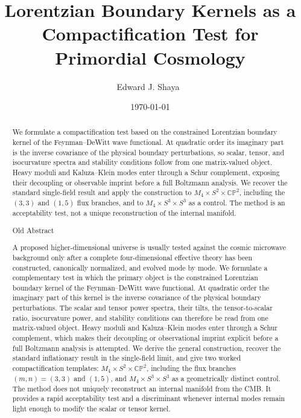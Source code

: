 \documentclass[aps,prd,twocolumn,superscriptaddress,nofootinbib,longbibliography,floatfix]{revtex4-2}
\newcommand{\CP}{\mathbb{CP}}
\begin{document}
\title{Lorentzian Boundary Kernels as a Compactification Test for Primordial Cosmology}

\author{Edward J. Shaya\ }



\date{\today}

\begin{abstract}
We formulate a compactification test based on the constrained Lorentzian boundary kernel of the Feynman--DeWitt wave functional. At quadratic order its imaginary part is the inverse covariance of the physical boundary perturbations, so scalar, tensor, and isocurvature spectra and stability conditions follow from one matrix-valued object. Heavy moduli and Kaluza--Klein modes enter through a Schur complement, exposing their decoupling or observable imprint before a full Boltzmann analysis. We recover the standard single-field result and apply the construction to $M_4\times S^2\times\CP^2$, including the $(3,3)$ and $(1,5)$ flux branches, and to $M_4\times S^3\times S^3$ as a control. The method is an acceptability test, not a unique reconstruction of the internal manifold.

Old Abstract

A proposed higher-dimensional universe is usually tested against the cosmic microwave background only after a complete four-dimensional effective theory has been constructed, canonically normalized, and evolved mode by mode. We formulate a complementary test in which the primary object is the constrained Lorentzian boundary kernel of the Feynman--DeWitt wave functional. At quadratic order the imaginary part of this kernel is the inverse covariance of the physical boundary perturbations. The scalar and tensor power spectra, their tilts, the tensor-to-scalar ratio, isocurvature power, and stability conditions can therefore be read from one matrix-valued object. Heavy moduli and Kaluza--Klein modes enter through a Schur complement, which makes their decoupling or observational imprint explicit before a full Boltzmann analysis is attempted. We derive the general construction, recover the standard inflationary result in the single-field limit, and give two worked compactification templates: $M_4\times S^2 \times \CP^2$, including the flux branches $(m,n)=(3,3)$ and $(1,5)$, and $M_4 \times S^3\times S^3$ as a geometrically distinct control. The method does not uniquely reconstruct an internal manifold from the CMB. It provides a rapid acceptability test and a discriminant whenever internal modes remain light enough to modify the scalar or tensor kernel.
\end{abstract}
\end{document}
